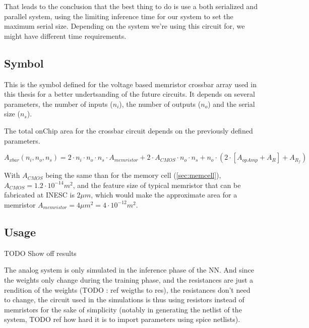 That leads to the conclusion that the best thing to do is use a both serialized and parallel system, using the limiting inference time for our system to set the maximum serial size. Depending on the system we're using this circuit for, we might have different time requirements.

\subsection{Symbol}
This is the symbol defined for the voltage based memristor crossbar array used in this thesis for a better undertsanding of the future circuits. It depends on several parameters, the number of inputs ($n_i$), the number of outputs ($n_o$) and the serial size ($n_s$).


The total onChip area for the crossbar circuit depends on the previously defined parameters.

\begin{equation}
  A_{xbar}(n_i,n_o,n_s)=2\cdot n_i\cdot n_o \cdot n_s\cdot A_{memristor}+2\cdot A_{CMOS}\cdot n_o\cdot n_s +n_o\cdot(2\cdot[A_{opAmp}+A_R]+A_{R_f})
\end{equation}

With $A_{CMOS}$ being the same than for the memory cell (\cref{sec:memcell}), $A_{CMOS}=1.2\cdot 10^{-14}m^2$, and the feature size of typical memristor that can be fabricated at INESC is $2\mu m$, which would make the approximate area for a memristor $A_{memristor}=4\mu m^2=4\cdot 10^{-12} m^2$.%

\subsection{Usage}

TODO Show off results

The analog system is only simulated in the inference phase of the \ac{NN}. And since the weights only change during the training phase, and the resistances are just a rendition of the weights (TODO : ref weigths to res), the resistances don't need to change, the circuit used in the simulations is thus using resistors instead of memristors for the sake of simplicity (notably in generating the netlist of the system, TODO ref how hard it is to import parameters using spice netlists).
